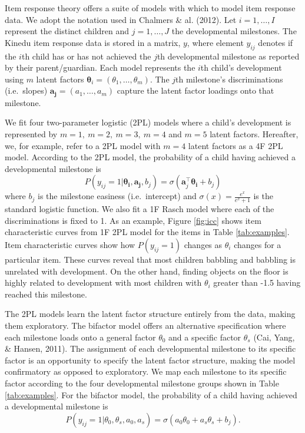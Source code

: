 \documentclass[10pt, letterpaper]{article}
\begin{document}
Item response theory offers a suite of models with which to model item
response data. We adopt the notation used in Chalmers \& al. (2012). Let
\(i = 1, \ldots, I\) represent the distinct children and
\(j = 1, \ldots, J\) the developmental milestones. The Kinedu item
response data is stored in a matrix, \(y\), where element \(y_{ij}\)
denotes if the \(i\)th child has or has not achieved the \(j\)th
developmental milestone as reported by their parent/guardian. Each model
represents the \(i\)th child's development using \(m\) latent factors
\(\boldsymbol{\theta}_{i}=(\theta_1, \dots, \theta_m)\). The \(j\)th
milestone's discriminations (i.e.~slopes)
\(\boldsymbol{a_j}=(a_1, \dots, a_m)\) capture the latent factor
loadings onto that milestone.

We fit four two-parameter logistic (2PL) models where a child's
development is represented by \(m = 1, \ m = 2, \ m = 3, \ m = 4\) and
\(m = 5\) latent factors. Hereafter, we, for example, refer to a 2PL
model with \(m = 4\) latent factors as a 4F 2PL model. According to the
2PL model, the probability of a child having achieved a developmental
milestone is \[
P(y_{ij} = 1 | \boldsymbol{\theta_i}, \boldsymbol{a_j}, b_j) = \sigma(\boldsymbol{a}_{j}^{\top}\boldsymbol{\theta_i} + b_j)
\] where \(b_j\) is the milestone easiness (i.e.~intercept) and
\(\sigma(x) = \frac{e^x}{e^x + 1}\) is the standard logistic function.
We also fit a 1F Rasch model where each of the discriminations is fixed
to 1. As an example, Figure \ref{fig:icc} shows item characteristic
curves from 1F 2PL model for the items in Table \ref{tab:examples}. Item
characteristic curves show how \(P(y_{ij} = 1)\) changes as \(\theta_i\)
changes for a particular item. These curves reveal that most children
babbling and babbling is unrelated with development. On the other hand,
finding objects on the floor is highly related to development with most
children with \(\theta_i\) greater than -1.5 having reached this
milestone.

The 2PL models learn the latent factor structure entirely from the data,
making them exploratory. The bifactor model offers an alternative
specification where each milestone loads onto a general factor
\(\theta_0\) and a specific factor \(\theta_s\) (Cai, Yang, \& Hansen,
2011). The assignment of each developmental milestone to its specific
factor is an opportunity to specify the latent factor structure, making
the model confirmatory as opposed to exploratory. We map each milestone
to its specific factor according to the four developmental milestone
groups shown in Table \ref{tab:examples}. For the bifactor model, the
probability of a child having achieved a developmental milestone is \[
P(y_{ij} = 1 | \theta_0, \theta_s, a_0, a_s) = \sigma(a_0\theta_0 + a_s\theta_s + b_j).
\]
\end{document}
